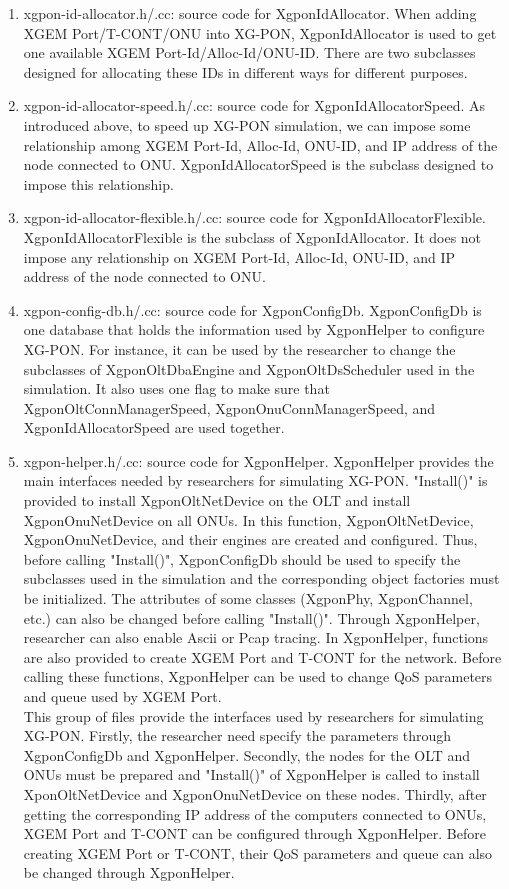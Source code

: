 \begin{enumerate}
 \item xgpon-id-allocator.h/.cc: source code for {\color{red} XgponIdAllocator}. When adding XGEM Port/T-CONT/ONU into XG-PON, 
XgponIdAllocator is used to get one available XGEM Port-Id/Alloc-Id/ONU-ID. There are two subclasses designed for allocating 
these IDs in different ways for different purposes.

 \item xgpon-id-allocator-speed.h/.cc: source code for {\color{red} XgponIdAllocatorSpeed}. As introduced above, 
to speed up XG-PON simulation, we can impose some relationship among XGEM Port-Id, Alloc-Id, ONU-ID, 
and IP address of the node connected to ONU. XgponIdAllocatorSpeed is the subclass designed to impose this relationship.

 \item xgpon-id-allocator-flexible.h/.cc: source code for {\color{red} XgponIdAllocatorFlexible}. 
XgponIdAllocatorFlexible is the subclass of XgponIdAllocator. It does not impose any relationship on XGEM Port-Id, 
Alloc-Id, ONU-ID, and IP address of the node connected to ONU.

 \item xgpon-config-db.h/.cc: source code for {\color{red} XgponConfigDb}. XgponConfigDb is one database 
that holds the information used by XgponHelper to configure XG-PON. For instance, it can be used by the researcher 
to change the subclasses of XgponOltDbaEngine and XgponOltDsScheduler used in the simulation. It also uses 
one flag to make sure that XgponOltConnManagerSpeed, XgponOnuConnManagerSpeed, and XgponIdAllocatorSpeed are used together.

 \item xgpon-helper.h/.cc: source code for {\color{red} XgponHelper}. XgponHelper provides the main interfaces 
needed by researchers for simulating XG-PON. "Install()" is provided to install XgponOltNetDevice on the OLT 
and install XgponOnuNetDevice on all ONUs. In this function, XgponOltNetDevice, XgponOnuNetDevice, and their engines
are created and configured. Thus, before calling "Install()", XgponConfigDb should be used to specify 
the subclasses used in the simulation and the corresponding object factories must be initialized. 
The attributes of some classes (XgponPhy, XgponChannel, etc.) can also be changed before calling "Install()". 
Through XgponHelper, researcher can also enable Ascii or Pcap tracing. In XgponHelper, functions are also 
provided to create XGEM Port and T-CONT for the network. Before calling these functions, XgponHelper 
can be used to change QoS parameters and queue used by XGEM Port.
\\
{\color{blue} This group of files provide the interfaces used by
researchers for simulating XG-PON. Firstly, the researcher need
specify the parameters through XgponConfigDb and XgponHelper.
Secondly, the nodes for the OLT and ONUs must be prepared and
"Install()" of XgponHelper is called to install XponOltNetDevice
and XgponOnuNetDevice on these nodes. Thirdly, after getting the
corresponding IP address of the computers connected to ONUs, XGEM
Port and T-CONT can be configured through XgponHelper. Before
creating XGEM Port or T-CONT, their QoS parameters and queue can
also be changed through XgponHelper.}
\end{enumerate}
